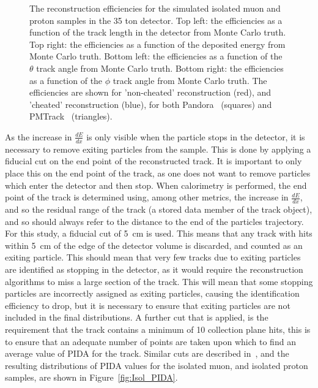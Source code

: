 \begin{figure}
  \caption[The reconstruction efficiencies for the simulated isolated muon and proton samples in the 35 ton detector.]
          {The reconstruction efficiencies for the simulated isolated muon and proton samples in the 35 ton detector. Top left: the efficiencies as a function of the track length in the detector from Monte Carlo truth. Top right: the efficiencies as a function of the deposited energy from Monte Carlo truth. Bottom left: the efficiencies as a function of the $\theta$ track angle from Monte Carlo truth. Bottom right: the efficiencies as a function of the $\phi$ track angle from Monte Carlo truth. The efficiencies are shown for 'non-cheated' reconstruction (red), and 'cheated' reconstruction (blue), for both Pandora~\citep{Pandora} (squares) and PMTrack~\citep{PMTrack} (triangles).}
   \label{fig:Isol_Effic}
\end{figure}

As the increase in $\frac{dE}{dx}$ is only visible when the particle stops in the detector, it is necessary to remove exiting particles from the sample. This is done by applying a fiducial cut on the end point of the reconstructed track. It is important to only place this on the end point of the track, as one does not want to remove particles which enter the detector and then stop. When calorimetry is performed, the end point of the track is determined using, among other metrics, the increase in $\frac{dE}{dx}$, and so the residual range of the track (a stored data member of the track object), and so should always refer to the distance to the end of the particles trajectory. For this study, a fiducial cut of 5~cm is used. This means that any track with hits within 5~cm of the edge of the detector volume is discarded, and counted as an exiting particle. This should mean that very few tracks due to exiting particles are identified as stopping in the detector, as it would require the reconstruction algorithms to miss a large section of the track. This will mean that some stopping particles are incorrectly assigned as exiting particles, causing the identification efficiency to drop, but it is necessary to ensure that exiting particles are not included in the final distributions. A further cut that is applied, is the requirement that the track contains a minimum of 10 collection plane hits, this is to ensure that an adequate number of points are taken upon which to find an average value of PIDA for the track. Similar cuts are described in~\citep{PIDA_Paper}, and the resulting distributions of PIDA values for the isolated muon, and isolated proton samples, are shown in Figure~\ref{fig:Isol_PIDA}. \\

